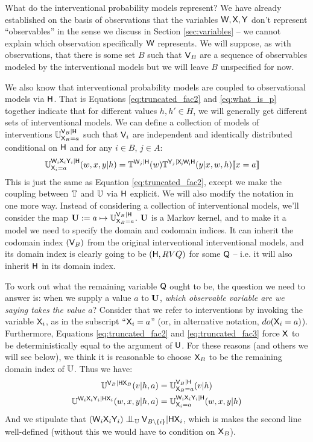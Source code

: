 What do the interventional probability models represent? We have already established on the basis of observations that the variables $\mathsf{W},\mathsf{X},\mathsf{Y}$ don't represent ``observables'' in the sense we discuss in Section \ref{sec:variables} -- we cannot explain which observation specifically $\mathsf{W}$ represents. We will suppose, as with observations, that there is some set $B$ such that $\mathsf{V}_B$ are a sequence of observables modeled by the interventional models but we will leave $B$ unspecified for now. 

We also know that interventional probability models are coupled to observational models via $\mathsf{H}$. That is Equations \ref{eq:truncated_fac2} and \ref{eq:what_is_p} together indicate that for different values $h,h'\in H$, we will generally get different sets of interventional models. We can define a collection of models of interventions $\mathbb{U}^{\mathsf{V}_B|\mathsf{H}}_{\mathsf{X}_B=a}$ such that $\mathsf{V}_i$ are independent and identically distributed conditional on $\mathsf{H}$ and for any $i\in B$, $j\in A$:
\begin{align}
    \mathbb{U}^{\mathsf{W}_i\mathsf{X}_i\mathsf{Y}_i|\mathsf{H}}_{\mathsf{X}_i=a}(w,x,y|h) &= \mathbb{T}^{\mathsf{W}_j|\mathsf{H}}(w)\mathbb{T}^{\mathsf{Y}_j|\mathsf{X_jW_jH}}(y|x,w,h)\llbracket x=a \rrbracket \label{eq:truncated_fac3}
\end{align}
This is just the same as Equation \ref{eq:truncated_fac2}, except we make the coupling between $\mathbb{T}$ and $\mathbb{U}$ via $\mathsf{H}$ explicit. We will also modify the notation in one more way. Instead of considering a collection of interventional models, we'll consider the map $\mathbf{U}:=a\mapsto \mathbb{U}^{\mathsf{V}_B|\mathsf{H}}_{\mathsf{X}_B=a}$. $\mathbf{U}$ is a Markov kernel, and to make it a model we need to specify the domain and codomain indices. It can inherit the codomain index $(\mathsf{V}_B)$ from the original interventional interventional models, and its domain index is clearly going to be $(\mathsf{H},RV{Q})$ for some $\mathsf{Q}$ -- i.e. it will also inherit $\mathsf{H}$ in its domain index. 

To work out what the remaining variable $\mathsf{Q}$ ought to be, the question we need to answer is: when we supply a value $a$ to $\mathbf{U}$, \emph{which observable variable are we saying takes the value $a$}?  Consider that we refer to interventions by invoking the variable $\mathsf{X}_i$, as in the subscript ``$\mathsf{X}_i=a$'' (or, in alternative notation, $do(\mathsf{X}_i=a)$). Furthermore, Equations \ref{eq:truncated_fac2} and \ref{eq:truncated_fac3} force $\mathsf{X}$ to be deterministically equal to the argument of $\mathsf{U}$. For these reasons (and others we will see below), we think it is reasonable to choose $\mathsf{X}_B$ to be the remaining domain index of $\mathbb{U}$. Thus we have:
\begin{align}
    \mathbb{U}^{\mathsf{V}_B|\mathsf{HX}_B}(v|h,a) &= \mathbb{U}^{\mathsf{V}_B|\mathsf{H}}_{\mathsf{X}_B=a}(v|h)\\
    \mathbb{U}^{\mathsf{W}_i\mathsf{X}_i\mathsf{Y}_i|\mathsf{HX}_i}(w,x,y|h,a)&=\mathbb{U}^{\mathsf{W}_i\mathsf{X}_i\mathsf{Y}_i|\mathsf{H}}_{\mathsf{X}_i=a}(w,x,y|h)
\end{align}
And we stipulate that $(\RV{W}_i\RV{X}_i\RV{Y}_i)\CI_\model{U} \RV{V}_{B\setminus \{i\}} | \RV{H}\RV{X}_i$, which is makes the second line well-defined (without this we would have to condition on $\mathsf{X}_B$).

